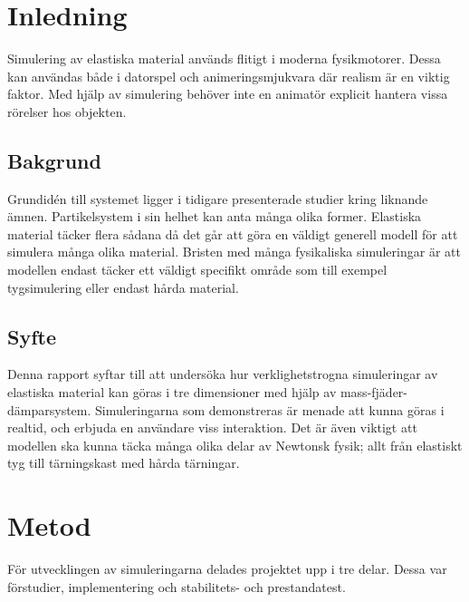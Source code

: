 \documentclass[a4paper,12pt,oneside,final,swedish]{extarticle}
\begin{document}
\tableofcontents  %
\listoffigures    %
\listoftables     %

\pagebreak
\pagestyle{plain}
\setcounter{page}{1}

\section{Inledning}
Simulering av elastiska material används flitigt i moderna fysikmotorer. Dessa kan användas både i datorspel och animeringsmjukvara där realism är en viktig faktor. Med hjälp av simulering behöver inte en animatör explicit hantera vissa rörelser hos objekten.
\subsection{Bakgrund}
Grundidén till systemet ligger i tidigare presenterade studier kring liknande ämnen. Partikelsystem i sin helhet kan anta många olika former. Elastiska material täcker flera sådana då det går att göra en väldigt generell modell för att simulera många olika material. Bristen med många fysikaliska simuleringar är att modellen endast täcker ett väldigt specifikt område som till exempel tygsimulering eller endast hårda material.
\subsection{Syfte}
Denna rapport syftar till att undersöka hur verklighetstrogna simuleringar av elastiska material kan göras i tre dimensioner med hjälp av mass-fjäder-dämparsystem. Simuleringarna som demonstreras är menade att kunna göras i realtid, och erbjuda en användare viss interaktion. Det är även viktigt att modellen ska kunna täcka många olika delar av Newtonsk fysik; allt från elastiskt tyg till tärningskast med hårda tärningar.

\section{Metod}
För utvecklingen av simuleringarna delades projektet upp i tre delar. Dessa var förstudier, implementering och stabilitets- och prestandatest.
\end{document}
